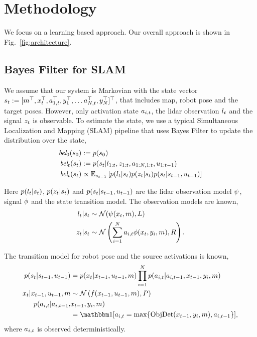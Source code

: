 \section{Methodology}

We focus on a learning based approach. Our overall approach is shown in Fig.~\ref{fig:architecture}.


\subsection{Bayes Filter for SLAM}

We assume that our system is Markovian with the state vector $s_t := [m^\top,
x_t^\top, a_{1,t}^\top, y_1^\top, \dots a_{N,t}^\top, y_N^\top]^\top$, that includes map, robot
pose and the target poses.
However, only activation state $a_{i,t}$, the lidar observation $l_t$ and the signal $z_t$ is observable.
To estimate the state, we use a typical Simultaneous Localization and
Mapping (SLAM) pipeline that uses Bayes Filter to update the distribution over the
state,
%
\begin{align}
  \textit{bel}_0(s_0) &:= p(s_0)
  \\
\textit{bel}_t(s_{t}) &:= p(s_t|l_{1:t}, z_{1:t}, a_{1:N,1:t}, u_{1:t-1})
  \\
  \textit{bel}_t(s_{t}) &\propto \mathbb{E}_{s_{t-1}} \left[p(l_{t}|s_{t})p(z_{t}| s_{t})p(s_{t}|s_{t-1}, u_{t-1}) \right]
                       \label{eq:bayes-filter}
\end{align}%
% 

Here $p(l_t|s_{t})$, $p(z_t|s_t)$  and
$p(s_t|s_{t-1}, u_{t-1})$ are the lidar observation model
$\psi$, signal $\phi$ and the state transition model.
The observation models are known,
%
\begin{align}
  l_t | s_t &\sim \mathcal{N}(\psi(x_t, m), L)
  \\
  z_t | s_t &\sim \mathcal{N}\left(\sum_{i=1}^N a_{i,t}\phi(x_t, y_i, m), R\right).
\end{align}%
% 

The transition model for robot pose and the source activations is known,
%
\begin{align}
p(\state_t|\state_{t-1}, \ctrl_{t-1}) &= p(\pose_t|\pose_{t-1}, \ctrl_{t-1}, \map)\prod_{i=1}^N p(\act_{i,t}|\act_{i,t-1}, \pose_{t-1}, \tgt_i, \map)
  \\
 \pose_t|\pose_{t-1}, \ctrl_{t-1}, \map &\sim \N\left(\dyn(\pose_{t-1}, \ctrl_{t-1}, \map), \pCov \right)
  \\
  p(\act_{i,t}|\act_{i,t-1}, &\pose_{t-1}, \tgt_i, \map) \nonumber \\
                              &= \ind[\act_{i,t} = \max\{\AlgObjDet(\pose_{t-1}, \tgt_i, \map), \act_{i,t-1} \}],
\end{align}%
%
where $a_{i,t}$ is observed deterministically.

